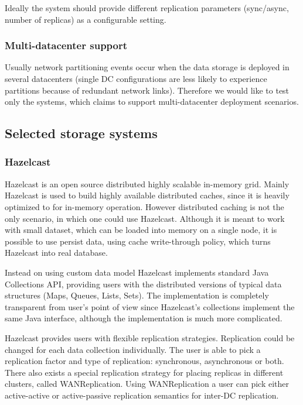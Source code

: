 \documentclass[a4paper]{article}
\begin{document}
Ideally the system should provide different replication parameters (sync/async, number of replicas) as a configurable setting.

\subsubsection*{Multi-datacenter support}

Usually network partitioning events occur when the data storage is deployed in several datacenters (single DC configurations are less likely to experience partitions because of redundant network links). 
Therefore we would like to test only the systems, which claims to support multi-datacenter deployment scenarios.

\subsection{Selected storage systems}

\subsubsection{Hazelcast}
Hazelcast is an open source distributed highly scalable in-memory grid.
Mainly Hazelcast is used to build highly available distributed caches, since it is heavily optimized to for in-memory operation.
However distributed caching is not the only scenario, in which one could use Hazelcast.
Although it is meant to work with small dataset, which can be loaded into memory on a single node, it is possible to use persist data, using cache write-through policy, which turns Hazelcast into real database.

Instead on using custom data model Hazelcast implements standard Java Collections API, providing users with the distributed versions of typical data structures (Maps, Queues, Lists, Sets).
The implementation is completely transparent from user's point of view since Hazelcast's collections implement the same Java interface, although the implementation is much more complicated.

Hazelcast provides users with flexible replication strategies.
Replication could be changed for each data collection individually.
The user is able to pick a replication factor and type of replication: synchronous, asynchronous or both.
There also exists a special replication strategy for placing replicas in different clusters, called WANReplication.
Using WANReplication a user can pick either active-active or active-passive replication semantics for inter-DC replication.
\end{document}
